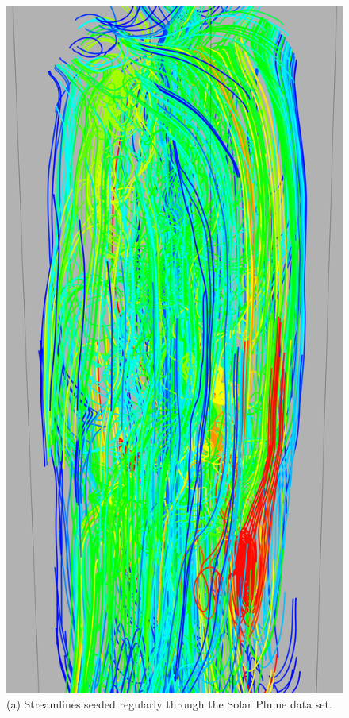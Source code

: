 \documentclass{egpubl}
\begin{document}
\begin{figure}[h]
        \centering
                \begin{minipage}{0.47\linewidth}
                        \includegraphics[height = 2\linewidth]{Images/plume_all_crop.png}\\(a) Streamlines seeded regularly through the Solar Plume data set. \vspace{0.2em}

\end{minipage}
\end{figure}
\end{document}
